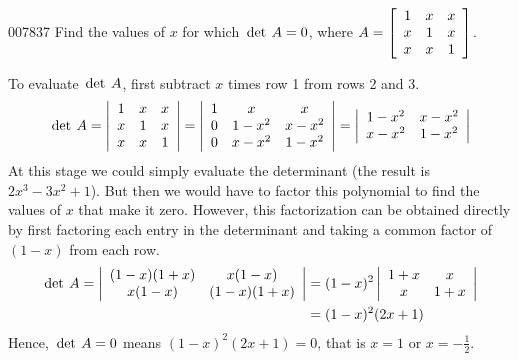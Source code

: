 \begin{example}{}{007837}
Find the values of $x$ for which $\thinspace\operatorname{det \medspace} A = 0$, where 
$A = \left[ \begin{array}{ccc}
1 & x & x \\
x & 1 & x \\
x & x & 1 
\end{array}
\right]$.

\begin{solution}
To evaluate $\thinspace\operatorname{det \medspace} A$, first subtract $x$ times row 1 from rows 2 and 3.
\begin{equation*}
\thinspace\operatorname{det \medspace} A = \left| \begin{array}{ccc}
1 & x & x \\
x & 1 & x \\
x & x & 1
\end{array} \right|
= 
\left| \begin{array}{ccc}
1 & x & x \\
0 & 1-x^2 & x-x^2 \\
0 & x-x^2 & 1-x^2
\end{array} \right|
= 
\left| \begin{array}{cc}
1-x^2 & x-x^2  \\
x-x^2 & 1-x^2 
\end{array} \right|
\end{equation*}
At this stage we could simply evaluate the determinant (the result is $2x^3-3x^2+1$). But then we would have to factor this polynomial to find the values of $x$
 that make it zero. However, this factorization can be obtained directly
 by first factoring each entry in the determinant and taking a common 
factor of $(1-x)$ from each row.
\begin{align*}
\thinspace\operatorname{det \medspace} A = \left| \begin{array}{cc}
(1-x)(1+x) & x(1-x) \\
x(1-x) & (1-x)(1+x)
\end{array}
\right| &= 
(1-x)^2 \left| \begin{array}{cc}
1+x & x \\
x & 1+x
\end{array} \right| \\
&= (1-x)^2(2x+1)
\end{align*}
Hence, $\thinspace\operatorname{det \medspace} A = 0$ means $(1 - x)^2(2x + 1) = 0$, that is $x = 1$ or $x = -\frac{1}{2}$.
\end{solution}
\end{example}


